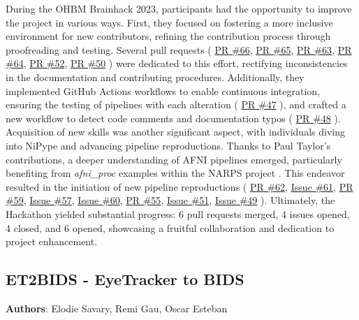 \documentclass{article}
\begin{document}
During the OHBM Brainhack 2023, participants had the opportunity to improve the project in various ways. First, they focused on fostering a more inclusive environment for new contributors, refining the contribution process through proofreading and testing. Several pull requests (
\href{https://github.com/Inria-Empenn/narps_open_pipelines/pull/66}{PR \#66},
\href{https://github.com/Inria-Empenn/narps_open_pipelines/pull/65}{PR \#65},
\href{https://github.com/Inria-Empenn/narps_open_pipelines/pull/63}{PR \#63},
\href{https://github.com/Inria-Empenn/narps_open_pipelines/pull/64}{PR \#64},
\href{https://github.com/Inria-Empenn/narps_open_pipelines/pull/52}{PR \#52},
\href{https://github.com/Inria-Empenn/narps_open_pipelines/pull/50}{PR \#50}
) were dedicated to this effort, rectifying inconsistencies in the documentation and contributing procedures.
Additionally, they implemented GitHub Actions workflows to enable continuous integration, ensuring the testing of pipelines with each alteration (
\href{https://github.com/Inria-Empenn/narps_open_pipelines/pull/47}{PR \#47}
), and crafted a new workflow to detect code comments and documentation typos (
\href{https://github.com/Inria-Empenn/narps_open_pipelines/pull/48}{PR \#48}
).
Acquisition of new skills was another significant aspect, with individuals diving into NiPype and advancing pipeline reproductions. Thanks to Paul Taylor's contributions, a deeper understanding of AFNI pipelines emerged, particularly benefiting from \textit{afni\_proc} examples within the NARPS project \cite{taylor2023}. This endeavor resulted in the initiation of new pipeline reproductions (
\href{https://github.com/Inria-Empenn/narps_open_pipelines/pull/62}{PR \#62},
\href{https://github.com/Inria-Empenn/narps_open_pipelines/issues/61}{Issue \#61},
\href{https://github.com/Inria-Empenn/narps_open_pipelines/pull/59}{PR \#59},
\href{https://github.com/Inria-Empenn/narps_open_pipelines/issues/57}{Issue \#57},
\href{https://github.com/Inria-Empenn/narps_open_pipelines/issues/60}{Issue \#60},
\href{https://github.com/Inria-Empenn/narps_open_pipelines/pull/55}{PR \#55},
\href{https://github.com/Inria-Empenn/narps_open_pipelines/issues/51}{Issue \#51},
\href{https://github.com/Inria-Empenn/narps_open_pipelines/issues/49}{Issue \#49}
).
Ultimately, the Hackathon yielded substantial progress: 6 pull requests merged, 4 issues opened, 4 closed, and 6 opened, showcasing a fruitful collaboration and dedication to project enhancement.



\subsection{ET2BIDS - EyeTracker to BIDS}
\textbf{Authors}: Elodie Savary, Remi Gau, Oscar Esteban
\end{document}
